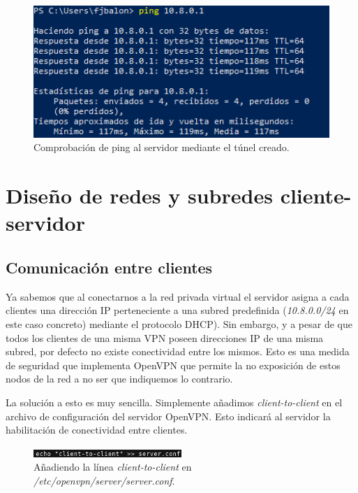 \documentclass[a4paper, 11pt, titlepage]{article}
\begin{document}
        \begin{figure}[htp]
            \centering
            \includegraphics[width=1\textwidth]{resources/windows12.png}
            \caption{Comprobación de ping al servidor mediante el túnel creado.}
            \label{fig:windows12}
        \end{figure}  

\section{Diseño de redes y subredes cliente-servidor}

    \subsection{Comunicación entre clientes}

        Ya sabemos que al conectarnos a la red privada virtual el servidor asigna a cada 
        clientes una dirección IP perteneciente a una subred predefinida (\textit{10.8.0.0/24}
        en este caso concreto) mediante el protocolo DHCP). Sin embargo, y a pesar de que 
        todos los clientes de una misma VPN poseen direcciones IP de una misma subred, por 
        defecto no existe conectividad entre los mismos. Esto es una medida de seguridad
        que implementa OpenVPN que permite la no exposición de estos nodos de la red a no
        ser que indiquemos lo contrario. 

        La solución a esto es muy sencilla. Simplemente añadimos \textit{client-to-client}
        en el archivo de configuración del servidor OpenVPN. Esto indicará al servidor
        la habilitación de conectividad entre clientes.

        \begin{figure}[htp]
            \centering
            \includegraphics[width=0.5\textwidth]{resources/configs01.png}
            \caption{Añadiendo la línea \textit{client-to-client} en \textit{/etc/openvpn/server/server.conf}.}
            \label{}
        \end{figure}  
\end{document}

